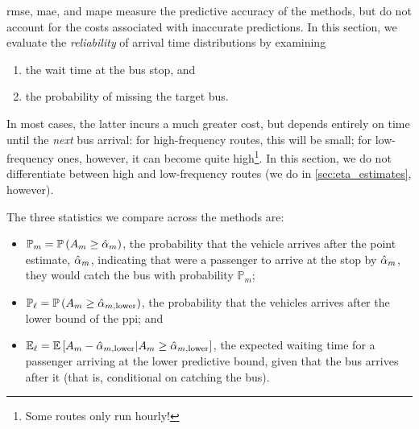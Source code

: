 \Gls{rmse}, \gls{mae}, and \gls{mape} measure the predictive accuracy of the methods, but do not account for the costs associated with inaccurate predictions. In this section, we evaluate the \emph{reliability} of arrival time distributions by examining
\begin{enumerate}
\item the wait time at the bus stop, and
\item the probability of missing the target bus.
\end{enumerate}
In most cases, the latter incurs a much greater cost, but depends entirely on time until the \emph{next} bus arrival: for high-frequency routes, this will be small; for low-frequency ones, however, it can become quite high\footnote{Some routes only run hourly!}. In this section, we do not differentiate between high and low-frequency routes (we do in \cref{sec:eta_estimates}, however).


The three statistics we compare across the methods are:
\begin{itemize}
\item $\mathbb{P}_m = \mathbb{P}\left(A_m \geq \hat{\alpha}_m\right)$, the probability that the vehicle arrives after the point estimate, $\hat{\alpha}_m$, indicating that were a passenger to arrive at the stop by $\hat{\alpha}_m$, they would catch the bus with probability $\mathbb{P}_m$;
\item $\mathbb{P}_\ell = \mathbb{P}\left(A_m \geq \hat\alpha_{m,\text{lower}}\right)$, the probability that the vehicles arrives after the lower bound of the \gls{ppi}; and
\item $\mathbb{E}_\ell = \mathbb{E}\left[A_m - \hat\alpha_{m,\text{lower}} | A_m \geq \hat\alpha_{m,\text{lower}}\right]$, the expected waiting time for a passenger arriving at the lower predictive bound, given that the bus arrives after it (that is, conditional on catching the bus).
\end{itemize}


